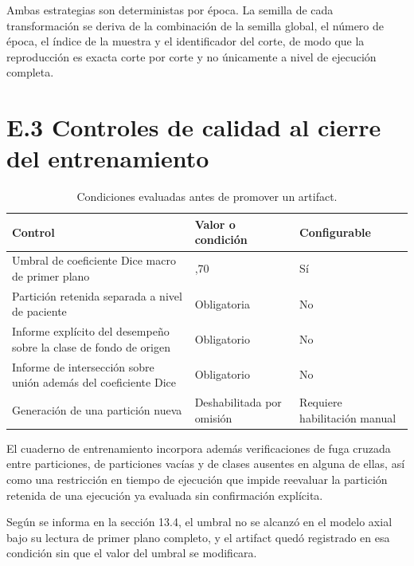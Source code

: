 Ambas estrategias son deterministas por época. La semilla de cada transformación se deriva de la combinación de la semilla global, el número de época, el índice de la muestra y el identificador del corte, de modo que la reproducción es exacta corte por corte y no únicamente a nivel de ejecución completa.

\section*{E.3 Controles de calidad al cierre del entrenamiento}
\label{anexo:entrenamiento-f3-controles-calidad}

\begin{table}[H]
\small
\centering
\caption{Condiciones evaluadas antes de promover un artifact.}
\label{tab:anexo-e-controles-promocion-artifact}
\begin{tabularx}{\textwidth}{|>{\raggedright\arraybackslash}p{}|>{\raggedright\arraybackslash}X|>{\raggedright\arraybackslash}X|}
\hline
\textbf{Control} & \textbf{Valor o condición} & \textbf{Configurable} \\
\hline
Umbral de coeficiente Dice macro de primer plano & 0,70 & Sí \\
\hline
Partición retenida separada a nivel de paciente & Obligatoria & No \\
\hline
Informe explícito del desempeño sobre la clase de fondo de origen & Obligatorio & No \\
\hline
Informe de intersección sobre unión además del coeficiente Dice & Obligatorio & No \\
\hline
Generación de una partición nueva & Deshabilitada por omisión & Requiere habilitación manual \\
\hline
\end{tabularx}
\end{table}

El cuaderno de entrenamiento incorpora además verificaciones de fuga cruzada entre particiones, de particiones vacías y de clases ausentes en alguna de ellas, así como una restricción en tiempo de ejecución que impide reevaluar la partición retenida de una ejecución ya evaluada sin confirmación explícita.

Según se informa en la sección 13.4, el umbral no se alcanzó en el modelo axial bajo su lectura de primer plano completo, y el artifact quedó registrado en esa condición sin que el valor del umbral se modificara. %

